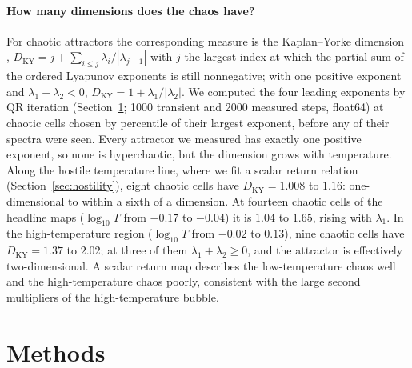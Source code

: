 \paragraph{How many dimensions does the chaos have?} For chaotic attractors the corresponding measure is the
Kaplan--Yorke dimension \cite{kaplan1979chaotic}, $D_{\mathrm{KY}}=j+\sum_{i\le j}\lambda_i/|\lambda_{j+1}|$ with $j$ the
largest index at which the partial sum of the ordered Lyapunov exponents is still nonnegative; with one positive
exponent and $\lambda_1+\lambda_2<0$, $D_{\mathrm{KY}}=1+\lambda_1/|\lambda_2|$. We computed the four leading exponents
by QR iteration (Section~\ref{sec:methods}; 1000 transient and 2000 measured steps, float64) at chaotic cells chosen
by percentile of their largest exponent, before any of their spectra were seen. Every attractor we measured has
exactly one positive exponent, so none is hyperchaotic, but the dimension grows with temperature. Along the hostile
temperature line, where we fit a scalar return relation (Section~\ref{sec:hostility}), eight chaotic cells have
$D_{\mathrm{KY}}=1.008$ to $1.16$: one-dimensional to within a sixth of a dimension. At fourteen chaotic cells of the
headline maps ($\log_{10}T$ from $-0.17$ to $-0.04$) it is $1.04$ to $1.65$, rising with $\lambda_1$. In the
high-temperature region ($\log_{10}T$ from $-0.02$ to $0.13$), nine chaotic cells have $D_{\mathrm{KY}}=1.37$ to
$2.02$; at three of them $\lambda_1+\lambda_2\ge0$, and the attractor is effectively two-dimensional. A scalar return
map describes the low-temperature chaos well and the high-temperature chaos poorly, consistent with the large second
multipliers of the high-temperature bubble.


\section{Methods}
\label{sec:methods}